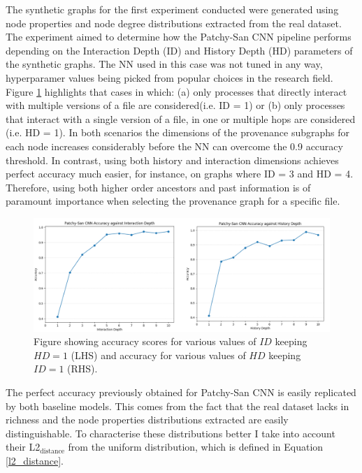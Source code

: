 The synthetic graphs for the first experiment conducted were generated using node properties and node degree distributions extracted from the real dataset. The experiment aimed to determine how the Patchy-San CNN pipeline performs depending on the Interaction Depth (ID) and History Depth (HD) parameters of the synthetic graphs. The NN used in this case was not tuned in any way, hyperparamer values being picked from popular choices in the research field. Figure \ref{inter_hist_depth_acc} highlights that cases in which: 
(a) only processes that directly interact with multiple versions of a file are considered(i.e. ID = 1) or (b) only processes that interact with a single version of a file, in one or multiple hops are considered (i.e. HD = 1). In both scenarios the dimensions of the provenance subgraphs for each node increases considerably before the NN can overcome the 0.9 accuracy threshold. In contrast, using both history and interaction dimensions achieves perfect accuracy much easier, for instance, on graphs where ID = 3 and HD = 4. Therefore, using both higher order ancestors and past information is of paramount importance when selecting the provenance graph for a specific file. 


\begin{figure}[H]
  \centering
  \centerline{\includegraphics[scale=0.475]{Images/inter_hist_deph_acc.png}}
  \caption{ Figure showing accuracy scores for various values of $ID$ keeping $HD = 1$ (LHS) and
    accuracy for various values of $HD$ keeping $ID = 1$ (RHS).}
  \label{inter_hist_depth_acc}
\end{figure}

The perfect accuracy previously obtained for Patchy-San CNN is easily replicated by both baseline models. This comes from the fact that the real dataset lacks in richness and the node properties distributions extracted are easily distinguishable. To characterise these distributions better I take into account their L2$_{\text{distance}}$ from the uniform distribution, which is defined in Equation \ref{l2_distance}.  

